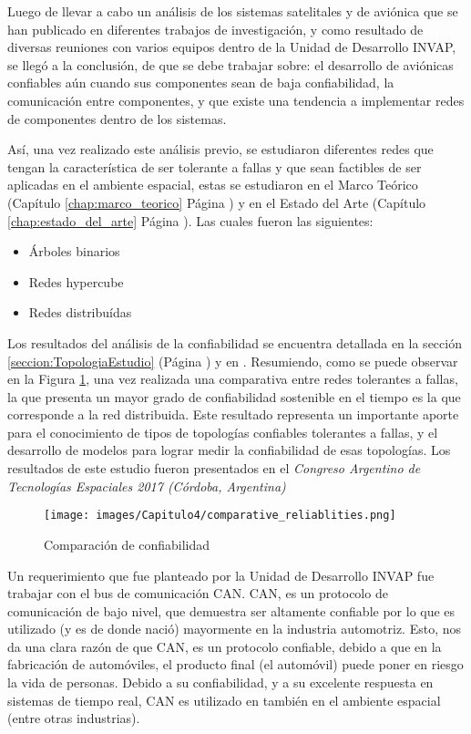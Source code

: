 Luego de llevar a cabo un análisis de los sistemas satelitales y de aviónica que se
han publicado en diferentes trabajos de investigación, y como resultado de  diversas reuniones
con varios equipos dentro de la Unidad de Desarrollo INVAP, se llegó a la conclusión,
de que se debe trabajar sobre: el  desarrollo de aviónicas confiables
aún cuando sus componentes sean de baja confiabilidad, la comunicación entre componentes,
y que existe una tendencia a implementar redes de componentes dentro de los sistemas.

Así, una vez realizado este análisis previo, se estudiaron diferentes redes que tengan
la característica de ser tolerante a fallas y que sean factibles de ser
aplicadas en el ambiente espacial, estas se estudiaron en el Marco
Teórico (Capítulo \ref{chap:marco_teorico} Página \pageref{chap:marco_teorico}) y en
el Estado del Arte (Capítulo \ref{chap:estado_del_arte} Página \pageref{chap:estado_del_arte}).
Las cuales fueron las siguientes:
\begin{itemize}
\item Árboles binarios
\item Redes hypercube
\item Redes distribuídas
\end{itemize}

Los resultados del análisis de la confiabilidad se encuentra detallada en la sección
\ref{seccion:TopologiaEstudio} (Página \pageref{seccion:TopologiaEstudio}) y en
\cite{Arias17}. Resumiendo, como se puede observar en la Figura
\ref{fig:comparative_reliablitiesConclusion}, una vez realizada una comparativa
entre redes tolerantes a fallas, la que presenta un mayor grado
de confiabilidad sostenible en el tiempo es la que corresponde a
la red distribuida. Este resultado representa un importante aporte para el
conocimiento de tipos de topologías confiables tolerantes a fallas, y el desarrollo de
modelos para lograr medir la confiabilidad de esas topologías. Los resultados de
este estudio fueron presentados en el \textit{Congreso Argentino de Tecnologías
  Espaciales 2017 (Córdoba, Argentina)}

\begin{figure}[H]
 \centering
 \texttt{[image: images/Capitulo4/comparative\_reliablities.png]}
  \caption{Comparación de confiabilidad}
\label{fig:comparative_reliablitiesConclusion}
\end{figure}

Un requerimiento que fue planteado por la Unidad de Desarrollo INVAP fue trabajar
con el bus de comunicación CAN. CAN, es un protocolo de comunicación de bajo nivel,
que demuestra ser altamente confiable por lo que es utilizado (y es de donde nació)
mayormente en la industria automotriz. Esto, nos da una clara razón de que CAN, es un
protocolo confiable, debido a que en la fabricación de automóviles, el producto final
(el automóvil) puede poner en riesgo la vida de personas. Debido a su confiabilidad,
y a su excelente respuesta en sistemas de tiempo real, CAN es utilizado en también en
el ambiente espacial (entre otras industrias).

